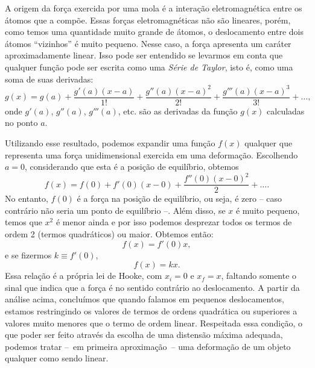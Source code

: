 A origem da força exercida por uma mola é a interação eletromagnética entre os átomos que a compõe. Essas forças eletromagnéticas não são lineares, porém, como temos uma quantidade muito grande de átomos, o deslocamento entre dois átomos ``vizinhos'' é muito pequeno. Nesse caso, a força apresenta um caráter aproximadamente linear. Isso pode ser entendido se levarmos em conta que qualquer função pode ser escrita como uma \emph{Série de Taylor}, isto é, como uma soma de suas derivadas:
\begin{equation}
	g(x) = g(a) + \frac{g'(a)(x - a)}{1!} + \frac{g''(a)(x-a)^2}{2!} + \frac{g'''(a)(x-a)^3}{3!} + \dots,
\end{equation}
onde $g'(a)$, $g''(a)$, $g'''(a)$, etc. são as derivadas da função $g(x)$ calculadas no ponto $a$.

Utilizando esse resultado, podemos expandir uma função $f(x)$ qualquer que representa uma força unidimensional exercida em uma deformação. Escolhendo $a=0$, considerando que esta é a posição de equilíbrio, obtemos
\begin{equation}
	f(x) = f(0) + f'(0) (x-0) + \frac{f''(0)(x-0)^2}{2} + \dots.
\end{equation}
%
No entanto, $f(0)$ é a força na posição de equilíbrio, ou seja, é zero -- caso contrário não seria um ponto de equilíbrio --. Além disso, se $x$ é muito pequeno, temos que $x^2$ é menor ainda e por isso podemos desprezar todos os termos de ordem 2 (termos quadráticos) ou maior. Obtemos então:
\begin{equation}
	f(x) = f'(0)x,
\end{equation}
%
e se fizermos $k \equiv f'(0)$,
\begin{equation}
	f(x) = kx.
\end{equation}
%
Essa relação é a própria lei de Hooke, com $x_i = 0$ e $x_f = x$, faltando somente o sinal que indica que a força é no sentido contrário ao deslocamento. A partir da análise acima, concluímos que quando falamos em pequenos deslocamentos, estamos restringindo os valores de termos de ordens quadrática ou superiores a valores muito menores que o termo de ordem linear. Respeitada essa condição, o que poder ser feito através da escolha de uma distensão máxima adequada, podemos tratar --~em primeira aproximação~-- uma deformação de um objeto qualquer como sendo linear.


